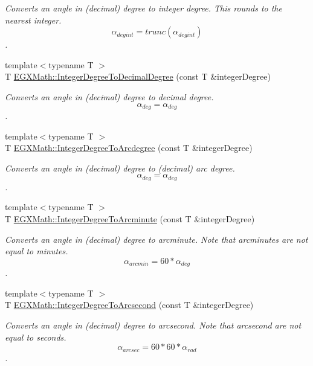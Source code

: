 \begin{DoxyCompactItemize}
\begin{DoxyCompactList}\small\item\em Converts an angle in (decimal) degree to integer degree. This rounds to the nearest integer. \[\alpha_{deg int}=trunc(\alpha_{deg int})\]. \end{DoxyCompactList}\item 
{\footnotesize template$<$typename T $>$ }\\T \mbox{\hyperlink{group___e_g_x_math-_angle_conversions-_integer_degree_gac219c3198508ba984d8d81d22831b27d}{E\+G\+X\+Math\+::\+Integer\+Degree\+To\+Decimal\+Degree}} (const T \&integer\+Degree)
\begin{DoxyCompactList}\small\item\em Converts an angle in (decimal) degree to decimal degree. \[\alpha_{deg}=\alpha_{deg}\]. \end{DoxyCompactList}\item 
{\footnotesize template$<$typename T $>$ }\\T \mbox{\hyperlink{group___e_g_x_math-_angle_conversions-_integer_degree_gaf633d0b82bfb7586ce86ffbcf78d8f7a}{E\+G\+X\+Math\+::\+Integer\+Degree\+To\+Arcdegree}} (const T \&integer\+Degree)
\begin{DoxyCompactList}\small\item\em Converts an angle in (decimal) degree to (decimal) arc degree. \[\alpha_{deg}=\alpha_{deg}\]. \end{DoxyCompactList}\item 
{\footnotesize template$<$typename T $>$ }\\T \mbox{\hyperlink{group___e_g_x_math-_angle_conversions-_integer_degree_ga78b014e7649d666a3647c467e64e4fe8}{E\+G\+X\+Math\+::\+Integer\+Degree\+To\+Arcminute}} (const T \&integer\+Degree)
\begin{DoxyCompactList}\small\item\em Converts an angle in (decimal) degree to arcminute. Note that arcminutes are not equal to minutes. \[\alpha_{arcmin}= 60 * \alpha_{deg}\]. \end{DoxyCompactList}\item 
{\footnotesize template$<$typename T $>$ }\\T \mbox{\hyperlink{group___e_g_x_math-_angle_conversions-_integer_degree_gaa04058a2fea3dc3678264a05fac6e1ae}{E\+G\+X\+Math\+::\+Integer\+Degree\+To\+Arcsecond}} (const T \&integer\+Degree)
\begin{DoxyCompactList}\small\item\em Converts an angle in (decimal) degree to arcsecond. Note that arcsecond are not equal to seconds. \[\alpha_{arcsec}=60 * 60 * \alpha_{rad}\]. \end{DoxyCompactList}\item 

\end{DoxyCompactItemize}
